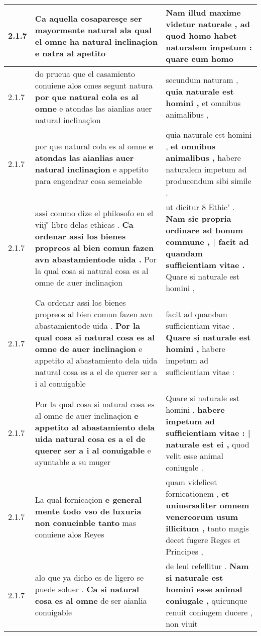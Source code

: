 \begin{tabular}{|p{1cm}|p{6.5cm}|p{6.5cm}|}
2.1.7 & Ca aquella cosaparesçe ser mayormente natural \textbf{ ala qual el omne ha natural inclinaçion } e natra al apetito & Nam illud maxime videtur naturale , \textbf{ ad quod homo habet naturalem impetum : } quare cum homo \\\hline
2.1.7 & do prueua que el casamiento conuiene alos omes segunt natura \textbf{ por que natural cola es al omne } e atondas las aianlias auer natural inclinaçion & secundum naturam , \textbf{ quia naturale est homini , } et omnibus animalibus , \\\hline
2.1.7 & por que natural cola es al omne \textbf{ e atondas las aianlias auer natural inclinaçion } e appetito para engendrar cosa semeiable & quia naturale est homini , \textbf{ et omnibus animalibus , } habere naturalem impetum ad producendum sibi simile . \\\hline
2.1.7 & assi commo dize el philosofo en el viij ̊ libro delas ethicas . \textbf{ Ca ordenar assi los bienes propreos al bien comun fazen avn abastamientode uida . } Por la qual cosa si natural cosa es al omne de auer inclinaçion & ut dicitur 8 Ethic’ . \textbf{ Nam sic propria ordinare ad bonum commune , | facit ad quandam sufficientiam vitae . } Quare si naturale est homini , \\\hline
2.1.7 & Ca ordenar assi los bienes propreos al bien comun fazen avn abastamientode uida . \textbf{ Por la qual cosa si natural cosa es al omne de auer inclinaçion } e appetito al abastamiento dela uida natural cosa es a el de querer ser a i al conuigable & facit ad quandam sufficientiam vitae . \textbf{ Quare si naturale est homini , } habere impetum ad sufficientiam vitae : \\\hline
2.1.7 & Por la qual cosa si natural cosa es al omne de auer inclinaçion \textbf{ e appetito al abastamiento dela uida natural cosa es a el de querer ser a i al conuigable } e ayuntable a su muger & Quare si naturale est homini , \textbf{ habere impetum ad sufficientiam vitae : | naturale est ei , } quod velit esse animal coniugale . \\\hline
2.1.7 & La qual fornicaçion \textbf{ e general mente todo vso de luxuria non conueinble tanto } mas conuiene alos Reyes & quam videlicet fornicationem , \textbf{ et uniuersaliter omnem venereorum usum illicitum , } tanto magis decet fugere Reges et Principes , \\\hline
2.1.7 & alo que ya dicho es de ligero se puede soluer . \textbf{ Ca si natural cosa es al omne } de ser aianlia conuigable & de leui refellitur . \textbf{ Nam si naturale est homini esse animal coniugale , } quicunque renuit coniugem ducere , non viuit \\\hline

\end{tabular}
